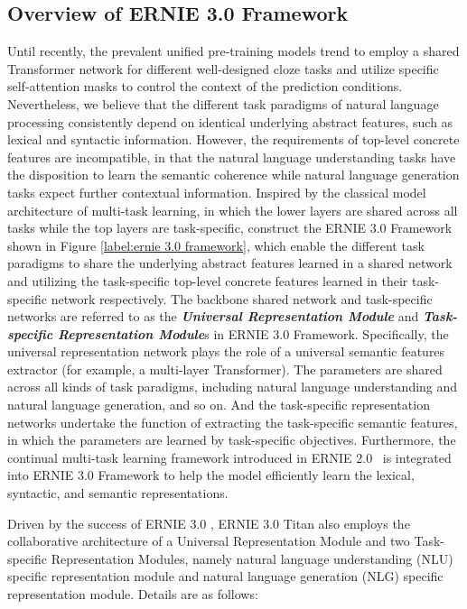 \subsection{Overview of ERNIE 3.0 Framework} Until recently, the prevalent unified pre-training models trend to employ a shared Transformer network for different well-designed cloze tasks and utilize specific self-attention masks to control the context of the prediction conditions. Nevertheless, we believe that the different task paradigms of natural language processing consistently depend on identical underlying abstract features, such as lexical and syntactic information. However, the requirements of top-level concrete features are incompatible, in that the natural language understanding tasks have the disposition to learn the semantic coherence while natural language generation tasks expect further contextual information. Inspired by the classical model architecture of multi-task learning, in which the lower layers are shared across all tasks while the top layers are task-specific, \cite{sun2021ernie} construct the ERNIE 3.0 Framework shown in Figure \ref{label:ernie 3.0 framework}, which enable the different task paradigms to share the underlying abstract features learned in a shared network and utilizing the task-specific top-level concrete features learned in their task-specific network respectively. The backbone shared network and task-specific networks are referred to as the \textbf{\textit{Universal Representation Module}} and \textbf{\textit{Task-specific Representation Module}}s in ERNIE 3.0 Framework. Specifically, the universal representation network plays the role of a universal semantic features extractor (for example, a multi-layer Transformer). The parameters are shared across all kinds of task paradigms, including natural language understanding and natural language generation, and so on. And the task-specific representation networks undertake the function of extracting the task-specific semantic features, in which the parameters are learned by task-specific objectives. Furthermore, the continual multi-task learning framework introduced in ERNIE 2.0~\cite{sun2020ernie} is integrated into ERNIE 3.0 Framework to help the model efficiently learn the lexical, syntactic, and semantic representations.

Driven by the success of ERNIE 3.0 \cite{sun2021ernie}, ERNIE 3.0 Titan also employs the collaborative architecture of a Universal Representation Module and two Task-specific Representation Modules, namely natural language understanding (NLU) specific representation module and natural language generation (NLG) specific representation module. Details are as follows:

